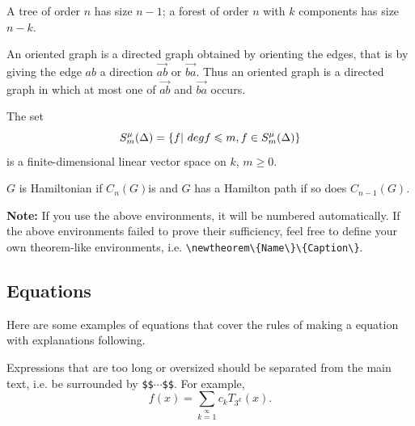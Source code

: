 \documentclass[print]{jicspack}
\begin{document}
\begin{col}
A tree of order $n$ has size $n-1$; a forest of order $n$ with $k$ components has size $n-k$.
\end{col}
\begin{defn}
An oriented graph is a directed graph obtained by orienting the edges,
that is by giving the edge $ab$ a direction $\overrightarrow{ab}$ or $\overrightarrow{ba}$.
Thus an oriented graph is a directed graph in which at most one of $\overrightarrow{ab}$ and $\overrightarrow{ba}$ occurs.
\end{defn}
\begin{pro}
The set
$$S_m^\mu(\Delta)=\{f|\  {\rm deg} f\leqslant m, f\in S_m^\mu(\Delta)\}$$
is a finite-dimensional linear vector space on $k$, $m\geqslant
0$.
\end{pro}
\begin{lem}
$G$ is Hamiltonian if $C_n(G)$is and $G$ has a Hamilton path if so does $C_{n-1}(G)$.
\end{lem}
{\bf Note:} If you use the above environments, it will be numbered
automatically. If the above environments failed to prove their
sufficiency, feel free to define your own theorem-like
environments, i.e. \verb|\newtheorem\{Name\}\{Caption\}|.
\subsection{Equations}
\label{equsection}
Here are some examples of equations that cover the rules of making a equation with explanations following.

Expressions that are too long or oversized should be separated
from the main text, i.e. be surrounded by
\verb|$$|$\cdots$\verb|$$|. For example,
$$
f(x)=\sum\limits_{k=1}\limits^{\infty}c_kT_{3^k}(x).$$
\end{document}
